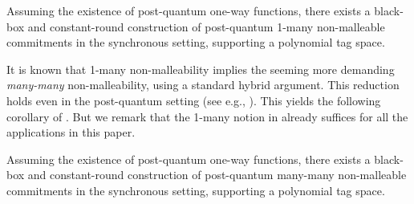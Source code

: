 
\begin{theorem}\label{thm:informal:1-many-NMC}
Assuming the existence of post-quantum one-way functions, there exists a black-box and constant-round construction of post-quantum 1-many non-malleable commitments in the synchronous setting, supporting a polynomial tag space.
\end{theorem}

It is known that 1-many non-malleability implies the seeming more demanding {\em many-many} non-malleability, using a standard hybrid argument. This reduction holds even in the post-quantum setting (see e.g., \cite[Lemma 7.3]{EC:ABGKM21}). This yields the following corollary of . But we remark that the 1-many notion in  already suffices for all the applications in this paper.

\begin{corollary}
Assuming the existence of post-quantum one-way functions, there exists a black-box and constant-round construction of post-quantum many-many non-malleable commitments in the synchronous setting, supporting a polynomial tag space.
\end{corollary}


